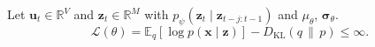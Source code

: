 \newcommand{\E}{\mathbb{E}}
Let \( \mathbf{u}_t \in \mathbb{R}^V \) and \( \mathbf{z}_t \in \mathbb{R}^M \) with
\( p_{\psi}(\mathbf{z}_t \mid \mathbf{z}_{t-j:t-1}) \) and \(\mu_\theta\), \(\bm{\sigma}_\theta\).
\begin{equation}
  \mathcal{L}(\theta) = \E_{q}\left[ \log p(\mathbf{x} \mid \mathbf{z}) \right] - D_{\mathrm{KL}}\!\left( q \,\|\, p \right) \le \infty.
\end{equation}
